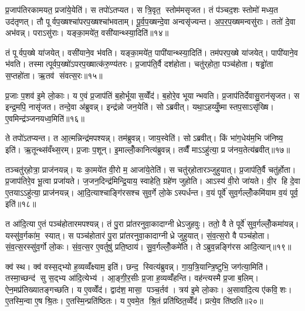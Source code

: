 प्र॒जाप॑तिरकामयत॒ प्रजा॑ये॒येति॑। स तपो॑ऽतप्यत। स त्रि॒वृत॒ स्तोम॑मसृजत। तं प॑ञ्चद॒शः स्तोमो॑ मध्य॒त उद॑तृणत्। तौ पूर्वप॒ख्षश्चा॑परप॒ख्षश्चा॑भवताम्। पू॒र्व॒प॒ख्षन्दे॒वा अन्वसृ॑ज्यन्त। अ॒प॒र॒प॒ख्षमन्वसु॑राः। ततो॑ दे॒वा अभ॑वन्न्। पराऽसु॑राः। यङ्का॒मये॑त॒ वसी॑यान्थ्स्या॒दिति॑॥१४॥

तं पूर्वप॒ख्षे या॑जयेत्। वसी॑याने॒व भ॑वति। यङ्का॒मये॑त॒ पापी॑यान्थ्स्या॒दिति॑। तम॑परप॒ख्षे या॑जयेत्। पापी॑याने॒व भ॑वति। तस्मात्पूर्वप॒ख्षो॑ऽपरप॒ख्षात्क॑रु॒ण्य॑तरः। प्र॒जाप॑ति॒र्वै दश॑होता। चतु॑र्‌होता॒ पञ्च॑होता। षड्ढो॑ता स॒प्तहो॑ता। ऋ॒तव॑ संवत्स॒रः॥१५॥

प्र॒जाः प॒शव॑ इ॒मे लो॒काः। य ए॒वं प्र॒जाप॑तिं ब॒होर्भूयास॒व्वेँद॑। ब॒होरे॒व भूयान्भवति। प्र॒जाप॑तिर्देवासु॒रान॑सृजत। स इन्द्र॒मपि॒ नासृ॑जत। तन्दे॒वा अ॑ब्रुवन्न्। इन्द्र॑न्नो जन॒येति॑। सोऽब्रवीत्। यथा॒ऽहय्युँ॒ष्मास्तप॒साऽसृ॑ख्षि। ए॒वमिन्द्र॑ञ्जनयध्व॒मिति॑॥१६॥

ते तपो॑ऽतप्यन्त। त आ॒त्मन्निन्द्र॑मपश्यन्न्। तम॑ब्रुवन्न्। जाय॒स्वेति॑। सोऽब्रवीत्। किं भा॑ग॒धेय॑म॒भि ज॑निष्य॒ इति॑। ऋ॒तून्थ्स॑वँथ्स॒रम्। प्र॒जाः प॒शून्। इ॒माल्लोँ॒कानित्य॑ब्रुवन्न्। तव्वैँ माऽऽहु॑त्या॒ प्र ज॑नय॒तेत्य॑ब्रवीत्॥१७॥

तञ्चतु॑र्‌होत्रा॒ प्राज॑नयन्न्। यः का॒मये॑त वी॒रो म॒ आजा॑ये॒तेति॑। स चतु॑र्‌होतारञ्जुहुयात्। प्र॒जाप॑ति॒र्वै चतु॑र्होता। प्र॒जाप॑तिरे॒व भू॒त्वा प्रजा॑यते। ज॒जन॒दिन्द्र॑मिन्द्रि॒याय॒ स्वाहेति॒ ग्रहे॑ण जुहोति। आऽस्य॑ वी॒रो जा॑यते। वी॒र हि दे॒वा ए॒तयाऽऽहु॑त्या॒ प्राज॑नयन्न्। आ॒दि॒त्याश्चाङ्गि॑रसश्च सुव॒र्गे लो॒केऽस्पर्धन्त। व॒यं पूर्वे॑ सुव॒र्गल्लोँ॒कमि॑याम व॒यं पूर्व॒ इति॑॥१८॥

त आ॑दि॒त्या ए॒तं पञ्च॑होतारमपश्यन्न्। तं पु॒रा प्रा॑तरनुवा॒कादाग्नीध्रेऽजुहवुः। ततो॒ वै ते पूर्वे॑ सुव॒र्गल्लोँ॒कमा॑यन्न्। यस्सु॑व॒र्गका॑म॒ स्यात्। स पञ्च॑होतारं पु॒रा प्रा॑तरनुवा॒कादाग्नीध्रे जुहुयात्। सं॒व॒त्स॒रो वै पञ्च॑होता। सं॒व॒त्स॒रस्सु॑व॒र्गो लो॒कः। सं॒व॒त्स॒र ए॒वर्तुषु॑ प्रति॒ष्ठाय॑। सु॒व॒र्गल्लोँ॒कमे॑ति। तेऽब्रुव॒न्नङ्गि॑रस आदि॒त्यान्॥१९॥

क्व॑ स्थ। क्व॑ वस्स॒द्भ्यो ह॒व्यव्वँ॑क्ष्याम॒ इति॑। छन्द॒ स्वित्य॑ब्रुवन्न्। गा॒य॒त्रि॒यान्त्रि॒ष्टुभि॒ जग॑त्या॒मिति॑। तस्मा॒च्छन्द॑ सु स॒द्भ्य आ॑दि॒त्येभ्य॑। आ॒ङ्गी॒र॒सीः प्र॒जा ह॒व्यव्वँ॑हन्ति। वह॑न्त्यस्मै प्र॒जा ब॒लिम्। ऐन॒मप्र॑तिख्यातङ्गच्छति। य ए॒वव्वेँद॑। द्वाद॑श॒ मासा॒ पञ्च॒र्तव॑। त्रय॑ इ॒मे लो॒काः। अ॒सावा॑दि॒त्य ए॑कवि॒शः। ए॒तस्मि॒न्वा ए॒ष श्रि॒तः। ए॒तस्मि॒न्प्रति॑ष्ठितः। य ए॒वमे॒त श्रि॒तं प्रति॑ष्ठित॒व्वेँद॑। प्रत्ये॒व ति॑ष्ठति॥२०॥\anuvakamend[स्या॒दिति॑ संवत्स॒रो ज॑नयध्व॒मितीत्य॑ब्रवी॒त्पूर्व॒ इत्या॑दि॒त्यानृ॒तव॒ष्षट्च॑]

